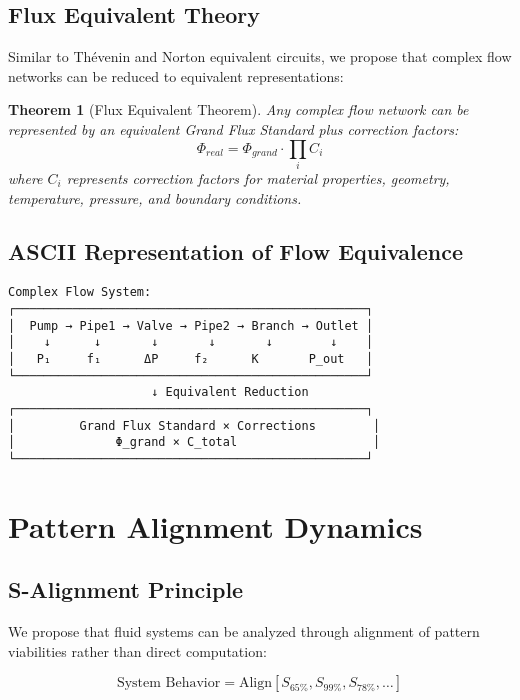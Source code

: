 \documentclass[12pt,a4paper]{article}
\newtheorem{theorem}{Theorem}
\begin{document}
\subsection{Flux Equivalent Theory}

Similar to Thévenin and Norton equivalent circuits, we propose that complex flow networks can be reduced to equivalent representations:

\begin{theorem}[Flux Equivalent Theorem]
Any complex flow network can be represented by an equivalent Grand Flux Standard plus correction factors:
\begin{equation}
\Phi_{real} = \Phi_{grand} \cdot \prod_{i} C_i
\end{equation}
where $C_i$ represents correction factors for material properties, geometry, temperature, pressure, and boundary conditions.
\end{theorem}

\subsection{ASCII Representation of Flow Equivalence}

\begin{verbatim}
Complex Flow System:
┌─────────────────────────────────────────────────┐
│  Pump → Pipe1 → Valve → Pipe2 → Branch → Outlet │
│    ↓      ↓       ↓       ↓       ↓        ↓    │
│   P₁     f₁      ΔP     f₂      K       P_out   │
└─────────────────────────────────────────────────┘
                    ↓ Equivalent Reduction
┌─────────────────────────────────────────────────┐
│         Grand Flux Standard × Corrections        │
│              Φ_grand × C_total                   │
└─────────────────────────────────────────────────┘
\end{verbatim}

\section{Pattern Alignment Dynamics}

\subsection{S-Alignment Principle}

We propose that fluid systems can be analyzed through alignment of pattern viabilities rather than direct computation:

\begin{equation}
\text{System Behavior} = \text{Align}[S_{65\%}, S_{99\%}, S_{78\%}, \ldots]
\end{equation}
\end{document}
